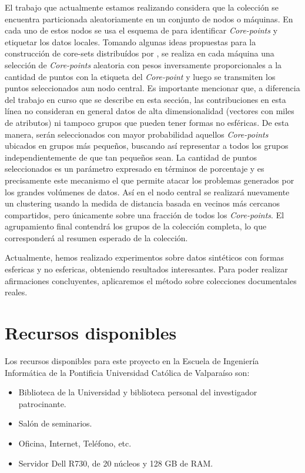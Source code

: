 \documentclass[10pt]{article}
\begin{document}
El trabajo que actualmente estamos realizando considera que la colección se encuentra particionada aleatoriamente en un conjunto de nodos o máquinas. En cada uno de estos nodos se usa el esquema de \cite{ESK03} para identificar \textit{Core-points} y etiquetar los datos locales. Tomando algunas ideas propuestas para la construcción de core-sets distribuídos por \cite{BEL13}, se realiza en cada máquina una selección de \textit{Core-points} aleatoria con pesos inversamente proporcionales a la cantidad de puntos con la etiqueta del \textit{Core-point} y luego se transmiten los puntos seleccionados aun nodo central. Es importante mencionar que, a diferencia del trabajo en curso que se describe en esta sección, las contribuciones en esta línea no consideran en general datos de alta dimensionalidad (vectores con miles de atributos) ni tampoco grupos que pueden tener formas no esféricas. De esta manera, serán seleccionados con mayor probabilidad aquellos \textit{Core-points} ubicados en grupos más pequeños, buscando así representar a todos los grupos independientemente de que tan peque\~nos sean. La cantidad de puntos seleccionados es un parámetro expresado en términos de porcentaje y es precisamente este mecanismo el que permite atacar los problemas generados por los grandes volúmenes de datos. Así en el nodo central se realizará nuevamente un clustering usando la medida de distancia basada en vecinos más cercanos compartidos, pero únicamente sobre una fracción de todos los \textit{Core-points}. El agrupamiento final contendrá los grupos de la colección completa, lo que corresponderá al resumen esperado de la colección.

Actualmente, hemos realizado experimentos sobre datos sintéticos con formas esfericas y no esfericas, obteniendo resultados interesantes. Para poder realizar afirmaciones concluyentes, aplicaremos el método sobre colecciones documentales reales.


\section{Recursos disponibles}
Los recursos disponibles para este proyecto en la Escuela de Ingeniería Informática de la Pontificia Universidad Católica de Valparaíso son:

\begin{itemize}
\item Biblioteca de la Universidad y biblioteca personal del investigador patrocinante.
\item Salón de seminarios.
\item Oficina, Internet, Teléfono, etc.
\item Servidor Dell R730, de 20 núcleos y 128 GB de RAM.
\end{itemize}
\end{document}
